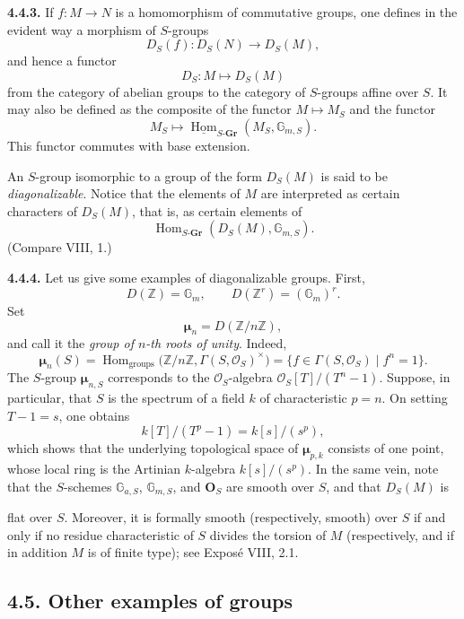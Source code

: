 \medskip
\noindent\textbf{4.4.3.}
If \(f:M\to N\) is a homomorphism of commutative groups, one defines in
the evident way a morphism of \(S\)-groups
\[
  D_S(f):D_S(N)\longrightarrow D_S(M),
\]
and hence a functor
\[
  D_S:M\longmapsto D_S(M)
\]
from the category of abelian groups to the category of \(S\)-groups
affine over \(S\). It may also be defined as the composite of the
functor \(M\mapsto M_S\) and the functor
\[
  M_S\longmapsto
  \underline{\operatorname{Hom}}_{S\text{-}\mathbf{Gr}}
    (M_S,\mathbb G_{m,S}).
\]
This functor commutes with base extension.

An \(S\)-group isomorphic to a group of the form \(D_S(M)\) is said to
be \emph{diagonalizable}. Notice that the elements of \(M\) are
interpreted as certain characters of \(D_S(M)\), that is, as certain
elements of
\[
  \operatorname{Hom}_{S\text{-}\mathbf{Gr}}
    (D_S(M),\mathbb G_{m,S}).
\]
(Compare VIII, 1.)

\medskip
\noindent\textbf{4.4.4.}
Let us give some examples of diagonalizable groups. First,
\[
  D(\mathbb Z)=\mathbb G_m,
  \qquad
  D(\mathbb Z^r)=(\mathbb G_m)^r.
\]
Set
\[
  \boldsymbol\mu_n=D(\mathbb Z/n\mathbb Z),
\]
and call it the \emph{group of \(n\)-th roots of unity}. Indeed,
\[
  \boldsymbol\mu_n(S)
    =\operatorname{Hom}_{\mathrm{groups}}
       \bigl(\mathbb Z/n\mathbb Z,\Gamma(S,\mathcal O_S)^{\times}\bigr)
    =\{f\in\Gamma(S,\mathcal O_S)\mid f^n=1\}.
\]
The \(S\)-group \(\boldsymbol\mu_{n,S}\) corresponds to the
\(\mathcal O_S\)-algebra \(\mathcal O_S[T]/(T^n-1)\). Suppose, in
particular, that \(S\) is the spectrum of a field \(k\) of
characteristic \(p=n\). On setting \(T-1=s\), one obtains
\[
  k[T]/(T^p-1)=k[s]/(s^p),
\]
which shows that the underlying topological space of
\(\boldsymbol\mu_{p,k}\) consists of one point, whose local ring is the
Artinian \(k\)-algebra \(k[s]/(s^p)\). In the same vein, note that the
\(S\)-schemes \(\mathbb G_{a,S}\), \(\mathbb G_{m,S}\), and
\(\mathbf O_S\) are smooth over \(S\), and that \(D_S(M)\) is

flat over \(S\). Moreover, it is formally smooth (respectively, smooth)
over \(S\) if and only if no residue characteristic of \(S\) divides
the torsion of \(M\) (respectively, and if in addition \(M\) is of
finite type); see Expos\'e VIII, 2.1.

\subsection*{4.5. Other examples of groups}

